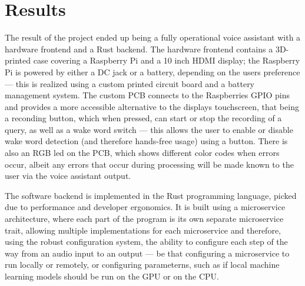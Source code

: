 \cleardoubleemptypage
\renewcommand*\chapterpagestyle{scrheadings}
\chapter{Results}
The result of the project ended up being a fully operational voice assistant with a hardware frontend and a Rust backend.
The hardware frontend contains a 3D-printed case covering a Raspberry Pi and a 10 inch HDMI display;
the Raspberry Pi is powered by either a DC jack or a battery, depending on the users preference ---
this is realized using a custom printed circuit board and a battery management system.
The custom PCB connects to the Raspberries GPIO pins and provides a more accessible alternative to the displays touchscreen,
that being a reconding button, which when pressed, can start or stop the recording of a query,
as well as a wake word switch --- this allows the user to enable or disable wake word detection (and therefore hands-free usage) using a button.
There is also an RGB led on the PCB, which shows different color codes when errors occur, albeit any errors
that occur during processing will be made known to the user via the voice assistant output.

The software backend is implemented in the Rust programming language, picked due to performance and developer ergonomics.
It is built using a microservice architecture, where each part of the program is its own separate microservice trait,
allowing multiple implementations for each microservice and therefore, using the robust configuration system,
the ability to configure each step of the way from an audio input to an output --- be that configuring
a microservice to run locally or remotely, or configuring parameterns, such as if local machine learning models
should be run on the GPU or on the CPU.

